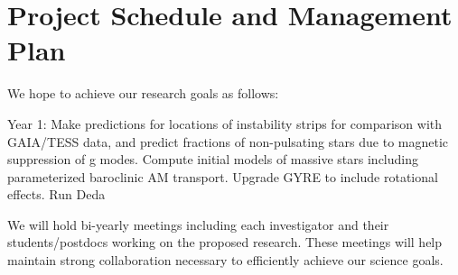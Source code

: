 \section{Project Schedule and Management Plan}

We hope to achieve our research goals as follows:

Year 1: Make predictions for locations of instability strips for comparison with GAIA/TESS data, and predict fractions of non-pulsating stars due to magnetic suppression of g modes. Compute initial models of massive stars including parameterized baroclinic AM transport. Upgrade GYRE to include rotational effects. Run Deda

We will  hold bi-yearly meetings including each investigator and their students/postdocs working on the proposed research. These meetings will help maintain strong collaboration necessary to efficiently achieve our science goals.
